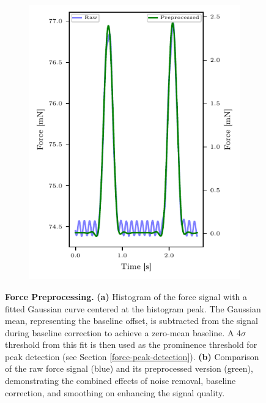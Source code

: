 \documentclass{report}
\begin{document}
\begin{figure}[H]
\begin{subfigure}[b]{0.45\textwidth}
                   \includegraphics[]{plots/chapter_3/force_raw_vs_preprocessed.pdf}
                    \caption[Force signal enhancement]{}
                    \label{fig:force-preprocessed}
                \end{subfigure}
                \caption[Force Preprocessing]{\textbf{Force Preprocessing.} \textbf{(a)} Histogram of the force signal with a fitted Gaussian curve centered at the histogram peak. The Gaussian mean, representing the baseline offset, is subtracted from the signal during baseline correction to achieve a zero-mean baseline. A 4$\sigma$ threshold from this fit is then used as the prominence threshold for peak detection (see Section \ref{force-peak-detection}). \textbf{(b)} Comparison of the raw force signal (blue) and its preprocessed version (green), demonstrating the combined effects of noise removal, baseline correction, and smoothing on enhancing the signal quality.}

    \end{figure}
\end{document}
